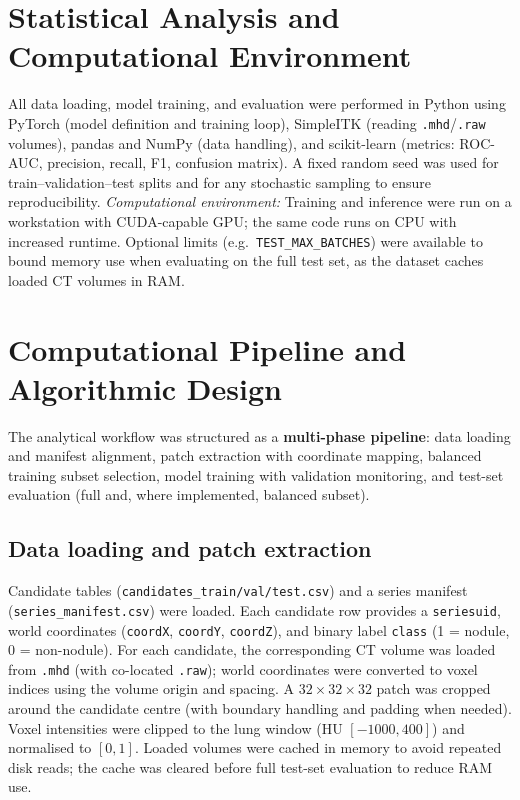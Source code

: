 \documentclass[11pt,a4paper]{article}
\begin{document}
\section{Statistical Analysis and Computational Environment}

All data loading, model training, and evaluation were performed in Python using PyTorch (model definition and training loop), SimpleITK (reading \texttt{.mhd}/\texttt{.raw} volumes), pandas and NumPy (data handling), and scikit-learn (metrics: ROC-AUC, precision, recall, F1, confusion matrix). A fixed random seed was used for train--validation--test splits and for any stochastic sampling to ensure reproducibility. \textit{Computational environment:} Training and inference were run on a workstation with CUDA-capable GPU; the same code runs on CPU with increased runtime. Optional limits (e.g.\ \texttt{TEST\_MAX\_BATCHES}) were available to bound memory use when evaluating on the full test set, as the dataset caches loaded CT volumes in RAM.

\section{Computational Pipeline and Algorithmic Design}

The analytical workflow was structured as a \textbf{multi-phase pipeline}: data loading and manifest alignment, patch extraction with coordinate mapping, balanced training subset selection, model training with validation monitoring, and test-set evaluation (full and, where implemented, balanced subset).

\subsection{Data loading and patch extraction}

Candidate tables (\texttt{candidates\_train/val/test.csv}) and a series manifest (\texttt{series\_manifest.csv}) were loaded. Each candidate row provides a \texttt{seriesuid}, world coordinates (\texttt{coordX}, \texttt{coordY}, \texttt{coordZ}), and binary label \texttt{class} (1 = nodule, 0 = non-nodule). For each candidate, the corresponding CT volume was loaded from \texttt{.mhd} (with co-located \texttt{.raw}); world coordinates were converted to voxel indices using the volume origin and spacing. A $32\times32\times32$ patch was cropped around the candidate centre (with boundary handling and padding when needed). Voxel intensities were clipped to the lung window (HU $[-1000, 400]$) and normalised to $[0,1]$. Loaded volumes were cached in memory to avoid repeated disk reads; the cache was cleared before full test-set evaluation to reduce RAM use.
\end{document}
